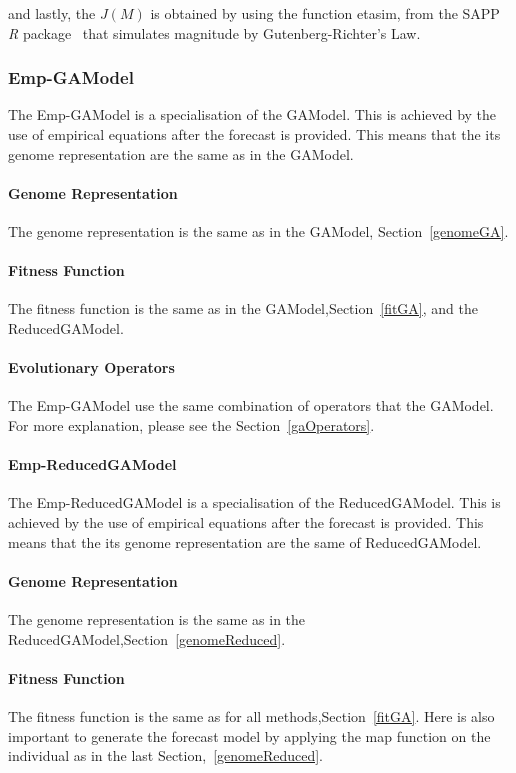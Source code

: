 and lastly, the $J(M)$ is obtained by using the function etasim, from the SAPP \textit{R} package~\cite{webSapp} that simulates magnitude by Gutenberg-Richter’s Law.


\subsubsection{Emp-GAModel}\label{emp-gamodel}
The Emp-GAModel is a specialisation of the GAModel. This is achieved by the use of empirical equations after the forecast is provided. This means that the its genome representation are the same as in the GAModel.
\paragraph{Genome Representation}
The genome representation is the same as in the GAModel, Section~\ref{genomeGA}.

\paragraph{Fitness Function}
The fitness function is the same as in the GAModel,Section~\ref{fitGA}, and the ReducedGAModel.
\paragraph{Evolutionary Operators}
The Emp-GAModel use the same combination of operators that the GAModel. For more explanation, please see the Section~\ref{gaOperators}.

\paragraph{Emp-ReducedGAModel}\label{emp-reducedgamodel}
The Emp-ReducedGAModel is a specialisation of the ReducedGAModel. This is achieved by the use of empirical equations after the forecast is provided. This means that the its genome representation are the same of ReducedGAModel.

\paragraph{Genome Representation}
The genome representation is the same as in the ReducedGAModel,Section~\ref{genomeReduced}. 

\paragraph{Fitness Function}
The fitness function is the same as for all methods,Section~\ref{fitGA}. Here is also important to generate the forecast model by applying the map function on the individual as in the last Section,~\ref{genomeReduced}.

